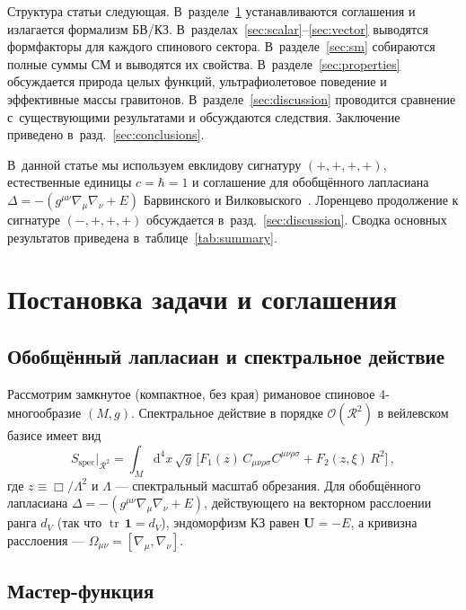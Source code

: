 \documentclass[12pt,a4paper]{article}
\newcommand{\Weylsq}{C_{\mu\nu\rho\sigma}C^{\mu\nu\rho\sigma}}
\newcommand{\dd}{\mathrm{d}}
\newcommand{\tr}{\operatorname{tr}}
\begin{document}
Структура статьи следующая. В~разделе~\ref{sec:setup} устанавливаются
соглашения и излагается формализм БВ/КЗ. В~разделах~\ref{sec:scalar}--\ref{sec:vector} выводятся формфакторы для каждого спинового сектора.
В~разделе~\ref{sec:sm} собираются полные суммы СМ и выводятся их свойства.
В~разделе~\ref{sec:properties} обсуждается природа целых функций,
ультрафиолетовое поведение и эффективные массы гравитонов.
В~разделе~\ref{sec:discussion} проводится сравнение с~существующими результатами
и обсуждаются следствия. Заключение приведено в~разд.~\ref{sec:conclusions}.

В~данной статье мы используем евклидову сигнатуру $(+,+,+,+)$, естественные
единицы $c = \hbar = 1$ и соглашение для обобщённого лапласиана
$\Delta = -(g^{\mu\nu}\nabla_\mu\nabla_\nu + E)$ Барвинского и
Вилковыского~\cite{Barvinsky:1985an}. Лоренцево продолжение к сигнатуре
$(-,+,+,+)$ обсуждается в~разд.~\ref{sec:discussion}. Сводка основных
результатов приведена в~таблице~\ref{tab:summary}.


\section{Постановка задачи и соглашения}
\label{sec:setup}

\subsection{Обобщённый лапласиан и спектральное действие}

Рассмотрим замкнутое (компактное, без края) римановое спиновое
4-многообразие $(M,g)$. Спектральное действие в порядке
$\mathcal{O}(\mathcal{R}^2)$ в вейлевском базисе имеет вид
\begin{equation}
  S_{\text{spec}}\Big|_{\mathcal{R}^2}
  = \int_M \dd^4x\,\sqrt{g}\,\bigl[
    F_1(z)\,\Weylsq + F_2(z,\xi)\,R^2
  \bigr]\,,
  \label{eq:spectral-action}
\end{equation}
где $z \equiv \Box/\Lambda^2$ и $\Lambda$ --- спектральный масштаб обрезания.
Для обобщённого лапласиана $\Delta = -(g^{\mu\nu}\nabla_\mu\nabla_\nu + E)$,
действующего на векторном расслоении ранга $d_V$ (так что $\tr\,\mathbf{1} = d_V$),
эндоморфизм КЗ равен $\mathbf{U} = -E$, а кривизна расслоения ---
$\Omega_{\mu\nu} = [\nabla_\mu, \nabla_\nu]$.

\subsection{Мастер-функция}
\end{document}
